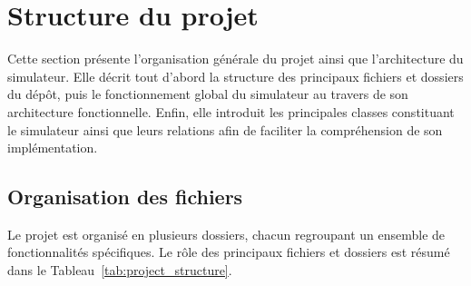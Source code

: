 \section{Structure du projet}

\noindent Cette section présente l'organisation générale du projet ainsi que l'architecture du simulateur. Elle décrit tout d'abord la structure des principaux fichiers et dossiers du dépôt, puis le fonctionnement global du simulateur au travers de son architecture fonctionnelle. Enfin, elle introduit les principales classes constituant le simulateur ainsi que leurs relations afin de faciliter la compréhension de son implémentation.

\subsection{Organisation des fichiers}

\noindent Le projet est organisé en plusieurs dossiers, chacun regroupant un ensemble de fonctionnalités spécifiques. Le rôle des principaux fichiers et dossiers est résumé dans le Tableau~\ref{tab:project_structure}.


